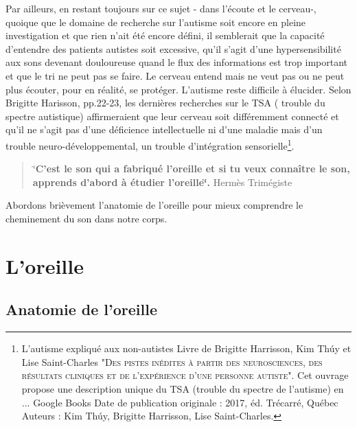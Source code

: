 Par ailleurs, en restant toujours sur ce sujet - dans l'écoute et le cerveau-, quoique que le domaine de recherche sur l'autisme soit encore en pleine investigation et que rien n'ait été encore défini, il semblerait que la capacité d'entendre des patients autistes soit excessive, qu'il s'agit d'une hypersensibilité aux sons devenant douloureuse quand  le flux des informations est trop important et que le tri ne peut pas se faire. Le cerveau entend mais ne veut pas ou ne peut plus  écouter, pour en réalité, se protéger. L'autisme reste difficile à élucider. Selon Brigitte Harisson, pp.22-23, les dernières recherches sur le TSA ( trouble du spectre autistique) affirmeraient que leur cerveau soit différemment connecté et qu'il ne s'agit pas d'une déficience intellectuelle ni d'une maladie mais d'un trouble neuro-développemental, un trouble d'intégration sensorielle\footnote{L'autisme expliqué aux non-autistes
Livre de Brigitte Harrisson, Kim Thúy et Lise Saint-Charles
\textsc{"Des pistes inédites à partir des neurosciences, des résultats cliniques et de l'expérience d'une personne autiste".} Cet ouvrage propose une description unique du TSA (trouble du spectre de l'autisme) en ... Google Books
Date de publication originale : 2017, éd. Trécarré, Québec
Auteurs : Kim Thúy, Brigitte Harrisson, Lise Saint-Charles.}.




\begin{quotation}
	\char`\"{}\textbf{C'est le son qui a fabriqué l'oreille et si tu veux connaître
		le son, apprends d'abord à étudier l\textquoteright oreille\char`\"{}.}
	Hermès Trimégiste
\end{quotation}
Abordons brièvement l'anatomie de l'oreille pour mieux comprendre le cheminement du son dans notre corps.

\section{L'oreille}

\subsection{Anatomie de l'oreille}

